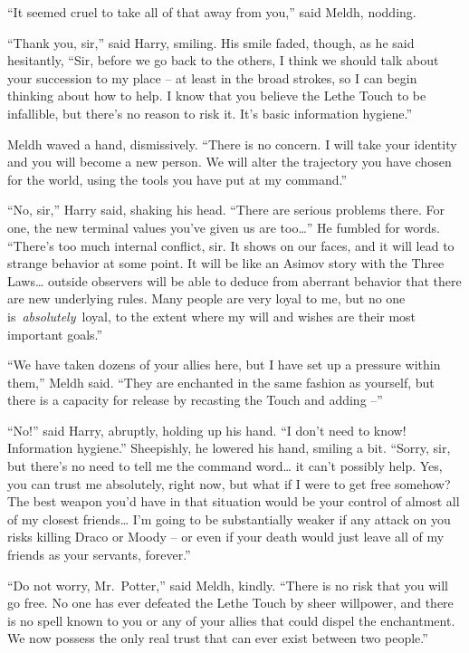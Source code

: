 ``It seemed cruel to take all of that away from you,'' said Meldh,
nodding.

``Thank you, sir,'' said Harry, smiling. His smile faded, though, as he
said hesitantly, ``Sir, before we go back to the others, I think we
should talk about your succession to my place -- at least in the broad
strokes, so I can begin thinking about how to help. I know that you
believe the Lethe Touch to be infallible, but there's no reason to risk
it. It's basic information hygiene.''

Meldh waved a hand, dismissively. ``There is no concern. I will take
your identity and you will become a new person. We will alter the
trajectory you have chosen for the world, using the tools you have put
at my command.''

``No, sir,'' Harry said, shaking his head. ``There are serious problems
there. For one, the new terminal values you've given us are
too\ldots{}'' He fumbled for words. ``There's too much internal
conflict, sir. It shows on our faces, and it will lead to strange
behavior at some point. It will be like an Asimov story with the Three
Laws\ldots{} outside observers will be able to deduce from aberrant
behavior that there are new underlying rules. Many people are very loyal
to me, but no one is~\emph{absolutely}~loyal, to the extent where my
will and wishes are their most important goals.''

``We have taken dozens of your allies here, but I have set up a pressure
within them,'' Meldh said. ``They are enchanted in the same fashion as
yourself, but there is a capacity for release by recasting the Touch and
adding --''

``No!'' said Harry, abruptly, holding up his hand. ``I don't need to
know! Information hygiene.'' Sheepishly, he lowered his hand, smiling a
bit. ``Sorry, sir, but there's no need to tell me the command
word\ldots{} it can't possibly help. Yes, you can trust me absolutely,
right now, but what if I were to get free somehow? The best weapon you'd
have in that situation would be your control of almost all of my closest
friends\ldots{} I'm going to be substantially weaker if any attack on
you risks killing Draco or Moody -- or even if your death would just
leave all of my friends as your servants, forever.''

``Do not worry, Mr.~Potter,'' said Meldh, kindly. ``There is no risk
that you will go free. No one has ever defeated the Lethe Touch by sheer
willpower, and there is no spell known to you or any of your allies that
could dispel the enchantment. We now possess the only real trust that
can ever exist between two people.''

